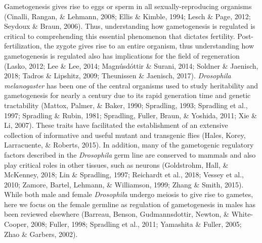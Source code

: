 \documentclass[12pt,oneside]{reedthesis}
\begin{document}
Gametogenesis gives rise to eggs or sperm in all sexually-reproducing
organisms (Cinalli, Rangan, \& Lehmann, 2008; Ellis \& Kimble, 1994; Lesch \& Page, 2012; Seydoux \& Braun, 2006).
Thus, understanding how gametogenesis is regulated is critical to
comprehending this essential phenomenon that dictates fertility.
Post-fertilization, the zygote gives rise to an entire organism, thus
understanding how gametogenesis is regulated also has implications for
the field of regeneration (Lasko, 2012; Lee \& Lee, 2014; Magnúsdóttir \& Surani, 2014; Soldner \& Jaenisch, 2018; Tadros \& Lipshitz, 2009; Theunissen \& Jaenisch, 2017).
\emph{Drosophila melanogaster} has been one of the central organisms used to
study heritability and gametogenesis for nearly a century due to its
rapid generation time and genetic tractability (Mattox, Palmer, \& Baker, 1990; Spradling, 1993; Spradling et al., 1997; Spradling \& Rubin, 1981; Spradling, Fuller, Braun, \& Yoshida, 2011; Xie \& Li, 2007). These traits have facilitated the establishment of an
extensive collection of informative and useful mutant and transgenic
flies (Hales, Korey, Larracuente, \& Roberts, 2015). In addition, many of the gametogenic regulatory
factors described in the \emph{Drosophila} germ line are conserved to mammals
and also play critical roles in other tissues, such as neurons
(Goldstrohm, Hall, \& McKenney, 2018; Lin \& Spradling, 1997; Reichardt et al., 2018; Vessey et al., 2010; Zamore, Bartel, Lehmann, \& Williamson, 1999; Zhang \& Smith, 2015). While both male and female \emph{Drosophila}
undergo meiosis to give rise to gametes, here we focus on the female
germline as regulation of gametogenesis in males has been reviewed
elsewhere (Barreau, Benson, Gudmannsdottir, Newton, \& White-Cooper, 2008; Fuller, 1998; Spradling et al., 2011; Yamashita \& Fuller, 2005; Zhao \& Garbers, 2002).
\end{document}

